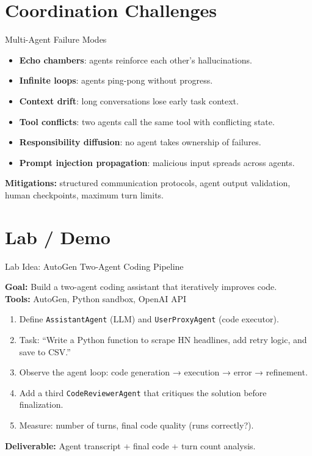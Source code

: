 \documentclass[aspectratio=169,10pt]{beamer}
\begin{document}
\section{Coordination Challenges}

\begin{frame}{Multi-Agent Failure Modes}
  \begin{tcolorbox}[alertbox, title=Common Failures]
    \begin{itemize}
      \item \textbf{Echo chambers}: agents reinforce each other's hallucinations.
      \item \textbf{Infinite loops}: agents ping-pong without progress.
      \item \textbf{Context drift}: long conversations lose early task context.
      \item \textbf{Tool conflicts}: two agents call the same tool with conflicting state.
      \item \textbf{Responsibility diffusion}: no agent takes ownership of failures.
      \item \textbf{Prompt injection propagation}: malicious input spreads across agents.
    \end{itemize}
  \end{tcolorbox}
  \vspace{0.3em}
  \textbf{Mitigations:} structured communication protocols, agent output validation,
  human checkpoints, maximum turn limits.
\end{frame}

\section{Lab / Demo}
\begin{frame}{Lab Idea: AutoGen Two-Agent Coding Pipeline}
  \begin{tcolorbox}[hitbox, title=Lab 10 — Multi-Agent Coding with AutoGen]
    \textbf{Goal:} Build a two-agent coding assistant that iteratively improves code.\\[4pt]
    \textbf{Tools:} AutoGen, Python sandbox, OpenAI API
    \begin{enumerate}
      \item Define \texttt{AssistantAgent} (LLM) and \texttt{UserProxyAgent} (code executor).
      \item Task: ``Write a Python function to scrape HN headlines, add retry logic, and save to CSV.''
      \item Observe the agent loop: code generation → execution → error → refinement.
      \item Add a third \texttt{CodeReviewerAgent} that critiques the solution before finalization.
      \item Measure: number of turns, final code quality (runs correctly?).
    \end{enumerate}
    \textbf{Deliverable:} Agent transcript + final code + turn count analysis.
  \end{tcolorbox}
\end{frame}
\end{document}
